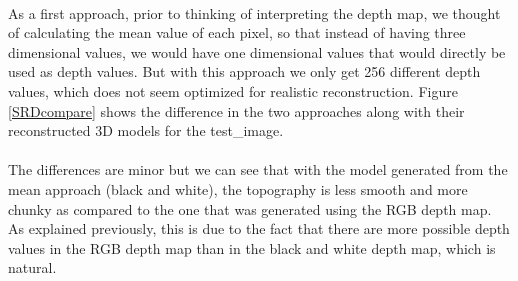 \documentclass[12pt, letterpaper]{article}
\begin{document}
\begin{spacing}{1.15}
\paragraph{}
As a first approach, prior to thinking of interpreting the depth map, we thought of calculating the mean value of each pixel, so that instead of having three dimensional
values, we would have one dimensional values that would directly be used as depth values. But with this approach we only get 256 different depth values, which does not seem
optimized for realistic reconstruction. Figure \ref{SRDcompare} shows the difference in the two approaches along with their reconstructed 3D models for the test\_image.
\paragraph{}
The differences are minor but we can see that with the model generated from the mean approach (black and white), the topography is less smooth and more chunky as compared to the one
that was generated using the RGB depth map. As explained previously, this is due to the fact that there are more possible depth values in the RGB depth map than in the black and white depth map, which is natural.


\end{spacing}
\end{document}
